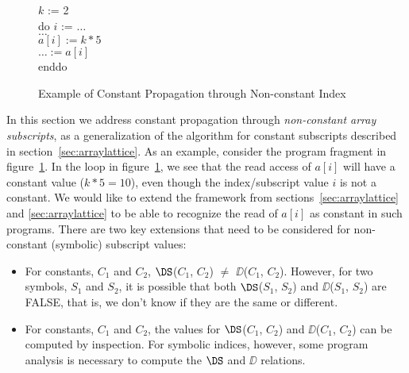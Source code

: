 \begin{figure}
\begin{center}
\parbox{3.0in}{
\begin{programa}
\Ta $k$ := 2 \\
\Ta do $i$ := $\ldots$ \\
\Tb  $\ldots$ \\
\Tb  $a[i] := k * 5$ \\
\Tb  $\ldots := a[i]$ \\
\Ta enddo \\
\end{programa}
}
\end{center}
\caption{Example of Constant Propagation through Non-constant Index}
\label{fig:non-const-ex-source}
\end{figure}

In this section we address constant propagation
through {\it non-constant array subscripts}, as a generalization
of the algorithm
for constant subscripts described in section~\ref{sec:arraylattice}.
As an example, consider the program fragment in
figure~\ref{fig:non-const-ex-source}.  In the loop in
figure~\ref{fig:non-const-ex-source}, we see that the read access of
$a[i]$ will have a constant value ($k*5=10$), even though the
index/subscript value $i$ is not a constant.  We would like to extend
the framework from sections~\ref{sec:arraylattice} and \ref{sec:arraylattice} to be
able to recognize the read of $a[i]$ as constant in such programs.
There are two key extensions that need to be considered
for non-constant (symbolic) subscript values:
\begin{itemize}

\item  For constants, $C_1$ and $C_2$, $\DS$($C_1$, $C_2$) $\neq$ 
$\DD$($C_1$, $C_2$). However, for two symbols,  $S_1$ and $S_2$,
it is possible that both $\DS$($S_1$, $S_2$) and $\DD$($S_1$,
$S_2$) are FALSE, that is, we don't know if they are the same or different.

\item For constants, $C_1$ and $C_2$, the values for $\DS$($C_1$, $C_2$) and 
$\DD$($C_1$, $C_2$) can be computed by inspection. For symbolic
indices, however, some program analysis is necessary
to compute the $\DS$ and $\DD$ relations.
\end{itemize} 

